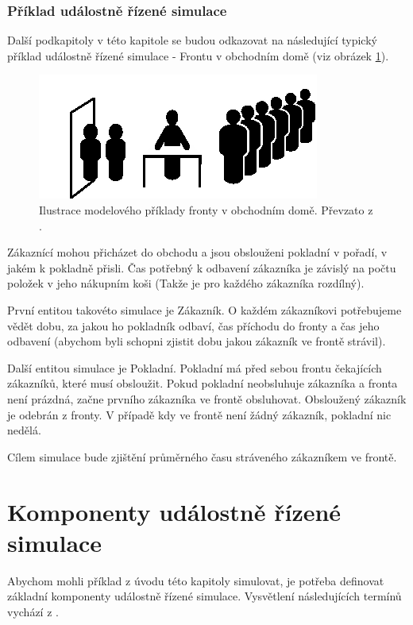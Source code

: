 \subsubsection{Příklad událostně řízené simulace}

Další podkapitoly v této kapitole se budou odkazovat na následující typický příklad událostně řízené simulace - Frontu v obchodním domě (viz obrázek \ref{fig:bank}).

\begin{figure}[ht]
\centering
\includegraphics[trim=0cm 0cm 0cm 0cm]{fig/bank}
\caption{Ilustrace modelového příklady fronty v obchodním domě. Převzato z \cite{adevs}.}
\label{fig:bank}
\end{figure}

Zákaznící mohou přicházet do obchodu a jsou obslouženi pokladní v pořadí, v jakém k pokladně přisli. Čas potřebný k odbavení zákazníka je závislý na počtu položek v jeho nákupním koši (Takže je pro každého zákazníka rozdílný).

První entitou takovéto simulace je Zákazník. O každém zákazníkovi potřebujeme vědět dobu, za jakou ho pokladník odbaví, čas příchodu do fronty a čas jeho odbavení (abychom byli schopni zjistit dobu jakou zákazník ve frontě strávil).

Další entitou simulace je Pokladní. Pokladní má před sebou frontu čekajících zákazníků, které musí obsloužit. Pokud pokladní neobsluhuje zákazníka a fronta není prázdná, začne prvního zákazníka ve frontě obsluhovat. Obsloužený zákazník je odebrán z fronty. V případě kdy ve frontě není žádný zákazník, pokladní nic nedělá.

Cílem simulace bude zjištění průměrného času stráveného zákazníkem ve frontě.

\section{Komponenty událostně řízené simulace}

Abychom mohli příklad z úvodu této kapitoly simulovat, je potřeba definovat základní komponenty událostně řízené simulace. Vysvětlení následujících termínů vychází z \cite{dess}.

